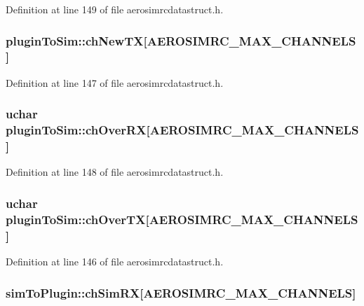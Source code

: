Definition at line 149 of file aerosimrcdatastruct.\-h.

\hypertarget{group___aero_sim_r_c_ga69be322d9251f2d0881402e3bb8b79cc}{
\subsubsection[{ch\-New\-T\-X}]{ plugin\-To\-Sim\-::ch\-New\-T\-X\mbox{[}{\bf A\-E\-R\-O\-S\-I\-M\-R\-C\-\_\-\-M\-A\-X\-\_\-\-C\-H\-A\-N\-N\-E\-L\-S}\mbox{]}}}\label{group___aero_sim_r_c_ga69be322d9251f2d0881402e3bb8b79cc}


Definition at line 147 of file aerosimrcdatastruct.\-h.

\hypertarget{group___aero_sim_r_c_ga3fe5834da184407de8227a046d5a7de7}{
\subsubsection[{ch\-Over\-R\-X}]{\setlength{\rightskip}{0pt plus 5cm}uchar plugin\-To\-Sim\-::ch\-Over\-R\-X\mbox{[}{\bf A\-E\-R\-O\-S\-I\-M\-R\-C\-\_\-\-M\-A\-X\-\_\-\-C\-H\-A\-N\-N\-E\-L\-S}\mbox{]}}}\label{group___aero_sim_r_c_ga3fe5834da184407de8227a046d5a7de7}


Definition at line 148 of file aerosimrcdatastruct.\-h.

\hypertarget{group___aero_sim_r_c_ga77e9265e0ad99dcc6a7c5cc35da0481d}{
\subsubsection[{ch\-Over\-T\-X}]{\setlength{\rightskip}{0pt plus 5cm}uchar plugin\-To\-Sim\-::ch\-Over\-T\-X\mbox{[}{\bf A\-E\-R\-O\-S\-I\-M\-R\-C\-\_\-\-M\-A\-X\-\_\-\-C\-H\-A\-N\-N\-E\-L\-S}\mbox{]}}}\label{group___aero_sim_r_c_ga77e9265e0ad99dcc6a7c5cc35da0481d}


Definition at line 146 of file aerosimrcdatastruct.\-h.

\hypertarget{group___aero_sim_r_c_gadefc3aa551adb807da0171a7a92f73ee}{
\subsubsection[{ch\-Sim\-R\-X}]{ sim\-To\-Plugin\-::ch\-Sim\-R\-X\mbox{[}{\bf A\-E\-R\-O\-S\-I\-M\-R\-C\-\_\-\-M\-A\-X\-\_\-\-C\-H\-A\-N\-N\-E\-L\-S}\mbox{]}}}\label{group___aero_sim_r_c_gadefc3aa551adb807da0171a7a92f73ee}


